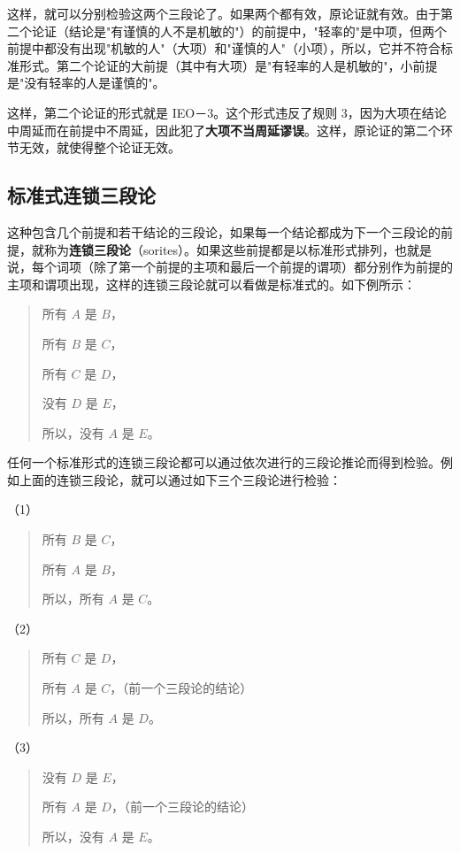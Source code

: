 这样，就可以分别检验这两个三段论了。如果两个都有效，原论证就有效。由于第二个论证（结论是"有谨慎的人不是机敏的"）的前提中，"轻率的"是中项，但两个前提中都没有出现"机敏的人"（大项）和"谨慎的人"（小项），所以，它并不符合标准形式。第二个论证的大前提（其中有大项）是"有轻率的人是机敏的"，小前提是"没有轻率的人是谨慎的"。

这样，第二个论证的形式就是 IEO－3。这个形式违反了规则 3，因为大项在结论中周延而在前提中不周延，因此犯了\textbf{大项不当周延谬误}。这样，原论证的第二个环节无效，就使得整个论证无效。

\subsection{标准式连锁三段论}

这种包含几个前提和若干结论的三段论，如果每一个结论都成为下一个三段论的前提，就称为\textbf{连锁三段论}（sorites）。如果这些前提都是以标准形式排列，也就是说，每个词项（除了第一个前提的主项和最后一个前提的谓项）都分别作为前提的主项和谓项出现，这样的连锁三段论就可以看做是标准式的。如下例所示：

\begin{quote}
所有 $A$ 是 $B$，

所有 $B$ 是 $C$，

所有 $C$ 是 $D$，

没有 $D$ 是 $E$，

所以，没有 $A$ 是 $E$。
\end{quote}

任何一个标准形式的连锁三段论都可以通过依次进行的三段论推论而得到检验。例如上面的连锁三段论，就可以通过如下三个三段论进行检验：

（1）
\begin{quote}
所有 $B$ 是 $C$，

所有 $A$ 是 $B$，

所以，所有 $A$ 是 $C$。
\end{quote}

（2）
\begin{quote}
所有 $C$ 是 $D$，

所有 $A$ 是 $C$，（前一个三段论的结论）

所以，所有 $A$ 是 $D$。
\end{quote}

（3）
\begin{quote}
没有 $D$ 是 $E$，

所有 $A$ 是 $D$，（前一个三段论的结论）

所以，没有 $A$ 是 $E$。
\end{quote}

